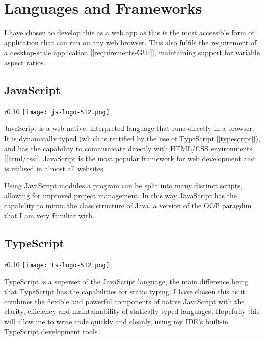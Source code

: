 \section{Languages and Frameworks}

    I have chosen to develop this as a web app as this is the most accessible form of application that can run on any web browser. This also fulfils the requirement of a desktop-scale application [\autoref{requirements-GUI}], maintaining support for variable aspect ratios.

    \subsection{JavaScript}

        \begin{wrapfigure}{r}{0.10\textwidth}
            \centering
            \texttt{[image: js-logo-512.png]}
        \end{wrapfigure}

        JavaScript is a web native, interpreted language that runs directly in a browser. It is dynamically typed (which is rectified by the use of TypeScript [\autoref{typescript}]), and has the capability to communicate directly with HTML/CSS environments [\autoref{html/css}]. JavaScript is the most popular framework for web development and is utilised in almost all websites.

        Using JavaScript modules a program can be split into many distinct scripts, allowing for improved project management. In this way JavaScript has the capability to mimic the class structure of Java, a version of the OOP paragdim that I am very familiar with.


    \subsection{TypeScript}
    \label{typescript}

        \begin{wrapfigure}{r}{0.10\textwidth}
            \centering
            \texttt{[image: ts-logo-512.png]}
        \end{wrapfigure}

        TypeScript \cite{typescript} is a superset of the JavaScript language, the main difference being that TypeScript has the capabilities for static typing. I have chosen this as it combines the flexible and powerful components of native JavaScript with the clarity, efficiency and maintainability of statically typed languages. Hopefully this will allow me to write code quickly and cleanly, using my IDE's built-in TypeScript development tools.


